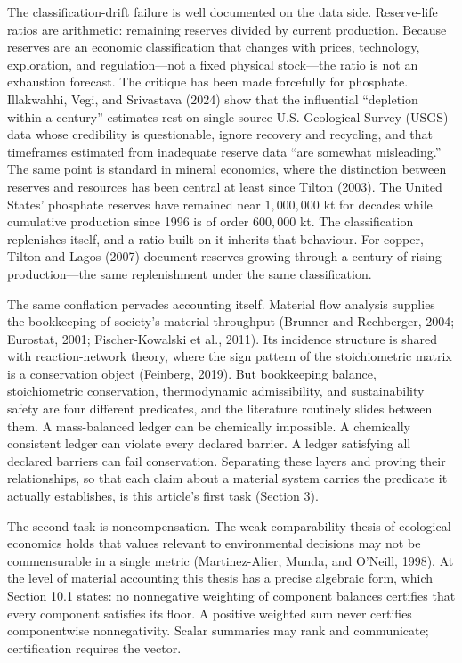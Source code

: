 \documentclass[11pt]{article}
\begin{document}
The classification-drift failure is well documented on the data side.
Reserve-life ratios are arithmetic: remaining reserves divided by
current production. Because reserves are an economic classification that
changes with prices, technology, exploration, and regulation---not a
fixed physical stock---the ratio is not an exhaustion forecast. The
critique has been made forcefully for phosphate. Illakwahhi, Vegi, and
Srivastava (2024) show that the influential ``depletion within a
century'' estimates rest on single-source U.S. Geological Survey (USGS)
data whose credibility is questionable, ignore recovery and recycling,
and that timeframes estimated from inadequate reserve data ``are
somewhat misleading.'' The same point is standard in mineral economics,
where the distinction between reserves and resources has been central at
least since Tilton (2003). The United States' phosphate reserves have
remained near \(1{,}000{,}000\) kt for decades while cumulative
production since 1996 is of order \(600{,}000\) kt. The classification
replenishes itself, and a ratio built on it inherits that behaviour. For
copper, Tilton and Lagos (2007) document reserves growing through a
century of rising production---the same replenishment under the same
classification.

The same conflation pervades accounting itself. Material flow analysis
supplies the bookkeeping of society's material throughput (Brunner and
Rechberger, 2004; Eurostat, 2001; Fischer-Kowalski et al., 2011). Its
incidence structure is shared with reaction-network theory, where the
sign pattern of the stoichiometric matrix is a conservation object
(Feinberg, 2019). But bookkeeping balance, stoichiometric conservation,
thermodynamic admissibility, and sustainability safety are four
different predicates, and the literature routinely slides between them.
A mass-balanced ledger can be chemically impossible. A chemically
consistent ledger can violate every declared barrier. A ledger
satisfying all declared barriers can fail conservation. Separating these
layers and proving their relationships, so that each claim about a
material system carries the predicate it actually establishes, is this
article's first task (Section 3).

The second task is noncompensation. The weak-comparability thesis of
ecological economics holds that values relevant to environmental
decisions may not be commensurable in a single metric (Martinez-Alier,
Munda, and O'Neill, 1998). At the level of material accounting this
thesis has a precise algebraic form, which Section 10.1 states: no
nonnegative weighting of component balances certifies that every
component satisfies its floor. A positive weighted sum never certifies
componentwise nonnegativity. Scalar summaries may rank and communicate;
certification requires the vector.
\end{document}
